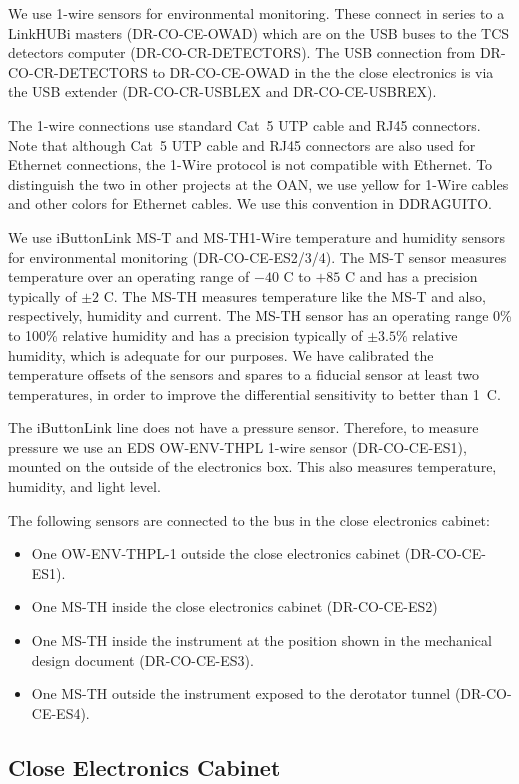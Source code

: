 \documentclass{article}
\begin{document}
We use 1-wire sensors for environmental monitoring. These connect in series to a LinkHUBi masters (DR-CO-CE-OWAD) which are on the USB buses to the TCS detectors computer (DR-CO-CR-DETECTORS). The USB connection from DR-CO-CR-DETECTORS to DR-CO-CE-OWAD in the the close electronics is via the USB extender (DR-CO-CR-USBLEX and DR-CO-CE-USBREX).

The 1-wire connections use standard Cat~5 UTP cable and RJ45 connectors. Note that although Cat~5 UTP cable and RJ45 connectors are also used for Ethernet connections, the 1-Wire protocol is not compatible with Ethernet. To distinguish the two in other projects at the OAN, we use yellow for 1-Wire cables and other colors for Ethernet cables. We use this convention in DDRAGUITO.

We use iButtonLink MS-T and MS-TH1-Wire temperature and humidity sensors for environmental monitoring (DR-CO-CE-ES2/3/4). The MS-T sensor measures temperature over an operating range of $-40$ C to $+85$ C and has a precision typically of $\pm 2$ C. The MS-TH measures temperature like the MS-T and also, respectively, humidity and current. The MS-TH sensor has an operating range 0\% to 100\% relative humidity and has a precision typically of $\pm 3.5\%$ relative humidity, which is adequate for our purposes. We have calibrated the temperature offsets of the sensors and spares to a fiducial sensor at least two temperatures, in order to improve the differential sensitivity to better than 1~C.

The iButtonLink line does not have a pressure sensor. Therefore, to measure pressure we use an EDS OW-ENV-THPL 1-wire sensor (DR-CO-CE-ES1), mounted on the outside of the electronics box. This also measures temperature, humidity, and light level.

The following sensors are connected to the bus in the close electronics cabinet:
\begin{itemize}
\item One OW-ENV-THPL-1 outside the close electronics cabinet (DR-CO-CE-ES1).
\item One MS-TH inside the close electronics cabinet (DR-CO-CE-ES2)
\item One MS-TH inside the instrument at the position shown in the mechanical design document (DR-CO-CE-ES3).
\item One MS-TH outside the instrument exposed to the derotator tunnel (DR-CO-CE-ES4).
\end{itemize}

\subsection{Close Electronics Cabinet}
\end{document}
